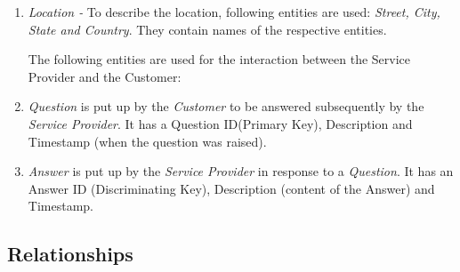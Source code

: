 \documentclass[a4paper]{article}
\begin{document}
\begin{enumerate}
\item \textit{Location -} To describe the location, following entities are used: \textit{Street, City, State and Country}. They contain names of the respective entities.

The following entities are used for the interaction between the Service Provider and the Customer:

\item \textit{Question} is put up by the \textit{Customer} to be answered subsequently by the \textit{Service Provider}. It has a Question ID(Primary Key), Description and Timestamp (when the question was raised).

\item \textit{Answer} is put up by the \textit{Service Provider} in response to a \textit{Question}. It has an Answer ID (Discriminating Key), Description (content of the Answer) and Timestamp.

\end{enumerate}
\subsection{Relationships}
\end{document}
